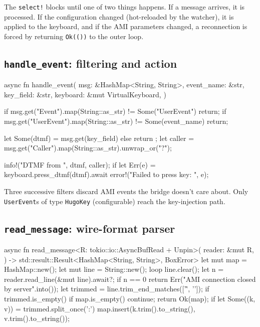 The \texttt{select!} blocks until one of two things happens. If a message arrives, it is processed. If the configuration changed (hot-reloaded by the watcher), it is applied to the keyboard, and if the AMI parameters changed, a reconnection is forced by returning \texttt{Ok(())} to the outer loop.

\subsection{\texttt{handle\_event}: filtering and action}

\begin{rustcode}
async fn handle_event(
    msg: &HashMap<String, String>,
    event_name: &str,
    key_field: &str,
    keyboard: &mut VirtualKeyboard,
) {
    if msg.get("Event").map(String::as_str) != Some("UserEvent") { return; }
    if msg.get("UserEvent").map(String::as_str) != Some(event_name) { return; }

    let Some(dtmf) = msg.get(key_field) else { return };
    let caller = msg.get("Caller").map(String::as_str).unwrap_or("?");

    info!("DTMF {} from {}", dtmf, caller);
    if let Err(e) = keyboard.press_dtmf(dtmf).await {
        error!("Failed to press key: {}", e);
    }
}
\end{rustcode}

Three successive filters discard AMI events the bridge doesn't care about. Only \texttt{UserEvent}s of type \texttt{HugoKey} (configurable) reach the key-injection path.

\subsection{\texttt{read\_message}: wire-format parser}

\begin{rustcode}
async fn read_message<R: tokio::io::AsyncBufRead + Unpin>(
    reader: &mut R,
) -> std::result::Result<HashMap<String, String>, BoxError> {
    let mut map = HashMap::new();
    let mut line = String::new();
    loop {
        line.clear();
        let n = reader.read_line(&mut line).await?;
        if n == 0 {
            return Err("AMI connection closed by server".into());
        }
        let trimmed = line.trim_end_matches(['\r', '\n']);
        if trimmed.is_empty() {
            if map.is_empty() { continue; }
            return Ok(map);
        }
        if let Some((k, v)) = trimmed.split_once(':') {
            map.insert(k.trim().to_string(), v.trim().to_string());
        }
    }
}
\end{rustcode}

